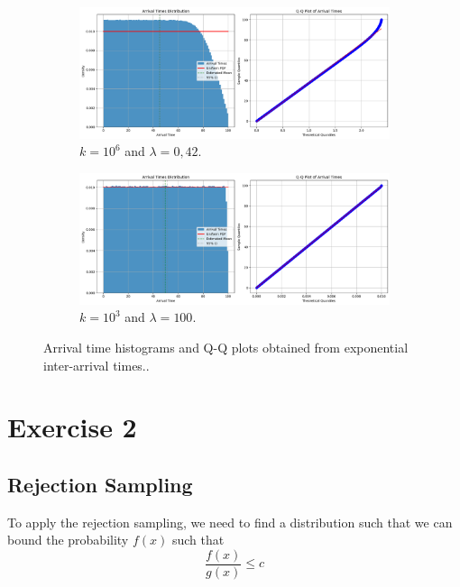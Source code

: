 \documentclass[a4paper]{article}
\begin{document}
\begin{figure}[htbp]
  \centering
  \begin{subfigure}[b]{0.48\textwidth}
    \centering
    \includegraphics[width=\textwidth]{images/ex1-p2.png}
    \caption{$k = 10^6$ and $\lambda = 0,42$.}\label{fig:ex1-p2}
  \end{subfigure}
  \hfill
  \begin{subfigure}[b]{0.48\textwidth}
    \centering
    \includegraphics[width=\textwidth]{images/ex1-p2-hl.png}
    \caption{$k = 10^3$ and $\lambda = 100$.}\label{fig:ex1-p2-hl}
  \end{subfigure}
  \caption{Arrival time histograms and Q-Q plots obtained from
  exponential inter-arrival times..}\label{fig:ex1-p2-combined}
\end{figure}

\section*{Exercise 2}

\subsection*{Rejection Sampling}
To apply the rejection sampling, we need to find a distribution such
that we can bound the probability $f(x)$ such that
\begin{equation*}
  \frac{f(x)}{g(x)} \leq c
\end{equation*}
\end{document}
